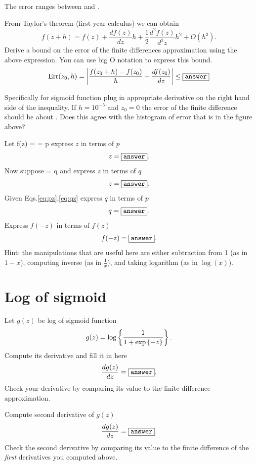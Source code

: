 \documentclass{article}
\begin{document}
\begin{remark} The error ranges between \answer and \answer.
\end{remark}

\newproblem{1pt}
From Taylor's theorem (first year calculus) we can obtain
\[
f(z+h) = f(z) + \frac{df(z)}{dz}h + \frac{1}{2}\frac{d^2f(z)}{d^2z}h^2 + O(h^3).
\]
Derive a bound on the error of the finite differences approximation using the above expression. You can use big O notation to express this bound.
\[
\textrm{Err}(z_0,h) = \left| \frac{f(z_0+h) - f(z_0)}{h} - \frac{df(z_0)}{dz} \right| \leq \fbox{\tt answer}
\]

Specifically for sigmoid function plug in appropriate derivative on the right hand side of the inequality. If $h=10^{-5}$ and $z_0 = 0$ the error of the finite difference should be about \answer.
Does this agree with the histogram of error that is in the figure above?

\newproblem{1pt}
Let
\BEQ\label{eq:pz}
f(z) =  = p
\EEQ
express $z$ in terms of $p$
\[
z = \fbox{\tt answer}.
\]
Now suppose
\BEQ\label{eq:qz}
 = q
\EEQ
and express $z$ in terms of $q$
\[
z = \fbox{\tt answer}.
\]
Given Eqs.\eqref{eq:pz},\eqref{eq:qz} express $q$ in terms of $p$
\[
q = \fbox{\tt answer}.
\]
Express $f(-z)$ in terms of $f(z)$
\[
f(-z) = \fbox{\tt answer}.
\]
Hint: the manipulations that are useful here are either subtraction from 1 (as in $1-x$), computing inverse (as in $\frac{1}{x}$), and taking logarithm (as in $\log(x)$).

\section*{Log of sigmoid}
\newproblem{1pt}
Let $g(z)$ be log of sigmoid function
\[
g(z) = \mathop{\rm log}\left\{ \frac{1}{1+ \mathop{\rm exp}\left\{-z\right\}} \right\}.
\]
Compute its derivative and fill it in here
\[
\frac{dg(z)}{dz} =  \answer.%
\]
Check your derivative by comparing its value to the finite difference approximation.


\newproblem{1pt}
Compute second derivative of $g(z)$
\[
\frac{dg(z)}{dz} =  \answer.%
\]
Check the second derivative by comparing its value to the finite difference of the {\em first} derivatives you computed above.
\end{document}
